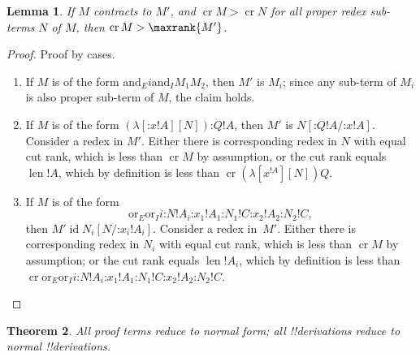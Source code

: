 \documentclass[10pt,a4paper]{article}
\theoremstyle{plain}
\newtheorem{thm}{Theorem}[section]
\newtheorem{lem}[thm]{Lemma}
\theoremstyle{definition}
\theoremstyle{remark}
\providecommand{\Subst}[3]{#1[#2/#3]}
\providecommand{\lambd}{\ensuremath{\lambda}}
\providecommand{\ande}{\mathrm{and}_E}
\providecommand{\andi}{\mathrm{and}_I}
\providecommand{\ore}{\mathrm{or}_E}
\providecommand{\ori}{\mathrm{or}_I}
\providecommand{\typeof}{\mathord{:}}
\providecommand{\len}{\operatorname{len}}
\providecommand{\ident}{\operatorname{id}}
\providecommand{\cutrank}{\operatorname{cr}}
\providecommand{\cutrank}{\operatorname{cr}}
\begin{document}
\begin{lem}
  If $M$ contracts to $M'$, and $\cutrank{M} > \cutrank{N}$ for all
  proper redex sub-terms $N$ of $M$, then $\cutrank{M} >
  \maxrank{M'}$.
\end{lem}

\begin{proof}
  Proof by cases.
  \begin{enumerate}
  \item If $M$ is of the form $\ande{i}{\andi{M_1}{M_2}}$, then $M'$ is
    $M_i$; since any sub-term of $M_i$ is also proper
    sub-term of $M$, the claim holds.
  \item If $M$ is of the form
    $(\lambd[\typeof{x}{!A}][N])\typeof{Q}{!A}$, then $M'$ is
    $\Subst{N}{\typeof{Q}{!A}}{\typeof{x}{!A}}$.  Consider a redex in
    $M'$.  Either there is corresponding redex in $N$ with equal cut
    rank, which is less than $\cutrank{M}$ by assumption, or the cut
    rank equals $\len{!A}$, which by definition is less than
    $\cutrank{(\lambd[x^{!A}][N])Q}$.
  \item If $M$ is of the form
    \[
    \ore{\ori{i}{}{\typeof{N}{!A_i}}}
        {\typeof{x_1}{!A_1}}{\typeof{N_1}{!C}}
        {\typeof{x_2}{!A_2}}{\typeof{N_2}{!C}},
    \]
    then $M' \ident \Subst{N_i}{N}{\typeof{x_i}{!A_i}}$.  Consider a
    redex in~$M'$. Either there is corresponding redex in $N_i$ with
    equal cut rank, which is less than $\cutrank{M}$ by assumption; or
    the cut rank equals $\len{!A_i}$, which by definition is less than
    $\cutrank{\ore{\ori{i}{}{\typeof{N}{!A_i}}}
      {\typeof{x_1}{!A_1}}{\typeof{N_1}{!C}}
      {\typeof{x_2}{!A_2}}{\typeof{N_2}{!C}}}$.
  \end{enumerate}
\end{proof}

\begin{thm}
  All proof terms reduce to normal form; all !!{derivation}s reduce to
  normal !!{derivation}s.
\end{thm}
\end{document}

